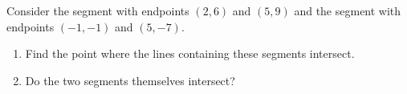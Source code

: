 Consider the segment with endpoints $(2,6)$ and $(5,9)$ and the segment with endpoints $(-1,-1)$ and $(5,-7)$.
\begin{enumerate}
\item[(a)] Find the point where the lines containing these segments intersect.
\item[(b)] Do the two segments themselves intersect?
\end{enumerate}
